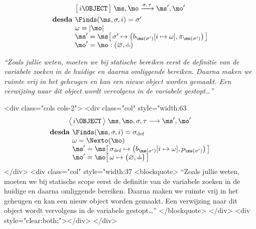 \begin{htmlskip}
  \begin{multicols}{2}
    \small
    \raggedcolumns
    \setlength{\columnseprule}{.5pt}
    \begin{minipage}{.25\textwidth}\vspace*{-1.1pc}%
\begin{gather*}
  \Terminates{i \OBJECT}
    {\ms, \mo}
    {\sigma, \tau}
    {\ms', \mo'} \\
  \begin{array}{r@{}l}%
    \textbf{desda } & {\Finds(\ms, \sigma, i) = \sigma'} \\
    &{\omega = |\mo|} \\
    &{\ms' = \ms \surr{ \sigma' \mapsto \big(b_{\ms(\sigma')}[i\mapsto \omega], \pi_{\ms(\sigma')}\big) }} \\
    &{\mo' = \mo : (\varnothing,\nil)}
  \end{array}
\end{gather*}%
    \end{minipage}
    
    \columnbreak
    
    \textit{“Zoals jullie weten, moeten we bij statische bereiken eerst de definitie van de variabele zoeken in de huidige en daarna omliggende bereiken. Daarna maken we ruimte vrij in het geheugen en kan een nieuw object worden gemaakt. Een verwijzing naar dit object wordt vervolgens in de variabele gestopt\dots”}
  \end{multicols}
\end{htmlskip}
\begin{htmlonly}
  <div class="cols cols-2">
    <div class="col" style="width:63%
      \begin{gather*}
        \Config{i \OBJECT}{\ms, \mo, \sigma, \tau}
        \longrightarrow
        \ms', \mo' \\
        \begin{array}{r@{}l}%
          \textbf{desda } & \Finds(\ms, \sigma, i) = \sigma_\text{def} \\
          & \omega = \Nexto(\mo) \\
          & \ms' = \ms \surr{ \sigma_\text{def} \mapsto \big(b_{\ms(\sigma')}[i\mapsto \omega], p_{\ms(\sigma')}\big) } \\
          & \mo' = \mo \surr{ \omega \mapsto \big(\varnothing, \nil\big) }
        \end{array}
      \end{gather*}
    </div>
    <div class="col" style="width:37%
      <blockquote>
        “Zoals jullie weten, moeten we bij statische scope eerst de definitie van de variabele zoeken in de huidige
        en daarna omliggende bereiken. Daarna maken we ruimte vrij in het geheugen en kan een nieuw object worden gemaakt.
        Een verwijzing naar dit object wordt vervolgens in de variabele gestopt…”
      </blockquote>
    </div>
    <div style="clear:both;"></div>
  </div>
\end{htmlonly}

